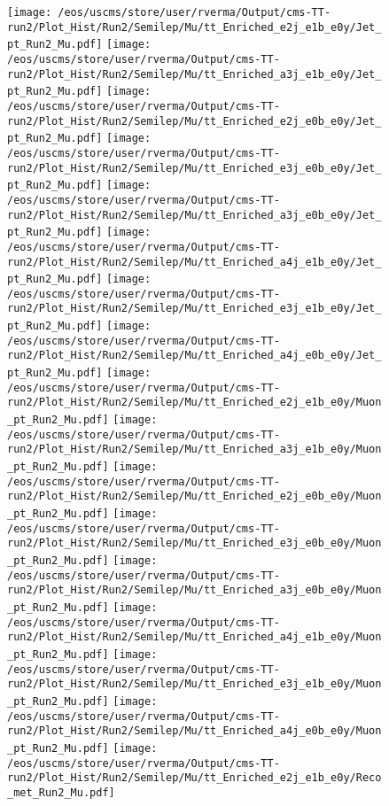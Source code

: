 \begin{figure}
\centering
\texttt{[image: /eos/uscms/store/user/rverma/Output/cms-TT-run2/Plot\_Hist/Run2/Semilep/Mu/tt\_Enriched\_e2j\_e1b\_e0y/Jet\_pt\_Run2\_Mu.pdf]}
\texttt{[image: /eos/uscms/store/user/rverma/Output/cms-TT-run2/Plot\_Hist/Run2/Semilep/Mu/tt\_Enriched\_a3j\_e1b\_e0y/Jet\_pt\_Run2\_Mu.pdf]}
\texttt{[image: /eos/uscms/store/user/rverma/Output/cms-TT-run2/Plot\_Hist/Run2/Semilep/Mu/tt\_Enriched\_e2j\_e0b\_e0y/Jet\_pt\_Run2\_Mu.pdf]}
\texttt{[image: /eos/uscms/store/user/rverma/Output/cms-TT-run2/Plot\_Hist/Run2/Semilep/Mu/tt\_Enriched\_e3j\_e0b\_e0y/Jet\_pt\_Run2\_Mu.pdf]}
\texttt{[image: /eos/uscms/store/user/rverma/Output/cms-TT-run2/Plot\_Hist/Run2/Semilep/Mu/tt\_Enriched\_a3j\_e0b\_e0y/Jet\_pt\_Run2\_Mu.pdf]}
\texttt{[image: /eos/uscms/store/user/rverma/Output/cms-TT-run2/Plot\_Hist/Run2/Semilep/Mu/tt\_Enriched\_a4j\_e1b\_e0y/Jet\_pt\_Run2\_Mu.pdf]}
\texttt{[image: /eos/uscms/store/user/rverma/Output/cms-TT-run2/Plot\_Hist/Run2/Semilep/Mu/tt\_Enriched\_e3j\_e1b\_e0y/Jet\_pt\_Run2\_Mu.pdf]}
\texttt{[image: /eos/uscms/store/user/rverma/Output/cms-TT-run2/Plot\_Hist/Run2/Semilep/Mu/tt\_Enriched\_a4j\_e0b\_e0y/Jet\_pt\_Run2\_Mu.pdf]}
\texttt{[image: /eos/uscms/store/user/rverma/Output/cms-TT-run2/Plot\_Hist/Run2/Semilep/Mu/tt\_Enriched\_e2j\_e1b\_e0y/Muon\_pt\_Run2\_Mu.pdf]}
\texttt{[image: /eos/uscms/store/user/rverma/Output/cms-TT-run2/Plot\_Hist/Run2/Semilep/Mu/tt\_Enriched\_a3j\_e1b\_e0y/Muon\_pt\_Run2\_Mu.pdf]}
\texttt{[image: /eos/uscms/store/user/rverma/Output/cms-TT-run2/Plot\_Hist/Run2/Semilep/Mu/tt\_Enriched\_e2j\_e0b\_e0y/Muon\_pt\_Run2\_Mu.pdf]}
\texttt{[image: /eos/uscms/store/user/rverma/Output/cms-TT-run2/Plot\_Hist/Run2/Semilep/Mu/tt\_Enriched\_e3j\_e0b\_e0y/Muon\_pt\_Run2\_Mu.pdf]}
\texttt{[image: /eos/uscms/store/user/rverma/Output/cms-TT-run2/Plot\_Hist/Run2/Semilep/Mu/tt\_Enriched\_a3j\_e0b\_e0y/Muon\_pt\_Run2\_Mu.pdf]}
\texttt{[image: /eos/uscms/store/user/rverma/Output/cms-TT-run2/Plot\_Hist/Run2/Semilep/Mu/tt\_Enriched\_a4j\_e1b\_e0y/Muon\_pt\_Run2\_Mu.pdf]}
\texttt{[image: /eos/uscms/store/user/rverma/Output/cms-TT-run2/Plot\_Hist/Run2/Semilep/Mu/tt\_Enriched\_e3j\_e1b\_e0y/Muon\_pt\_Run2\_Mu.pdf]}
\texttt{[image: /eos/uscms/store/user/rverma/Output/cms-TT-run2/Plot\_Hist/Run2/Semilep/Mu/tt\_Enriched\_a4j\_e0b\_e0y/Muon\_pt\_Run2\_Mu.pdf]}
\texttt{[image: /eos/uscms/store/user/rverma/Output/cms-TT-run2/Plot\_Hist/Run2/Semilep/Mu/tt\_Enriched\_e2j\_e1b\_e0y/Reco\_met\_Run2\_Mu.pdf]}

\end{figure}
